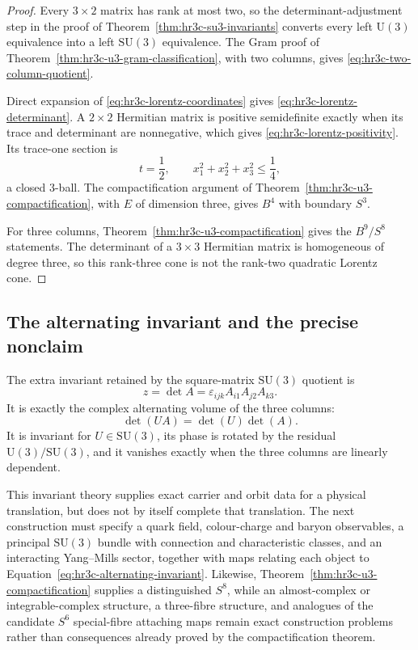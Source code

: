 \begin{proof}
Every \(3\times2\) matrix has rank at most two, so the determinant-adjustment
step in the proof of Theorem~\ref{thm:hr3c-su3-invariants} converts every
left \(\mathrm U(3)\) equivalence into a left \(\mathrm{SU}(3)\)
equivalence.  The Gram proof of
Theorem~\ref{thm:hr3c-u3-gram-classification}, with two columns, gives
\eqref{eq:hr3c-two-column-quotient}.

Direct expansion of \eqref{eq:hr3c-lorentz-coordinates} gives
\eqref{eq:hr3c-lorentz-determinant}.  A \(2\times2\) Hermitian matrix is
positive semidefinite exactly when its trace and determinant are
nonnegative, which gives \eqref{eq:hr3c-lorentz-positivity}.  Its trace-one
section is
\[
 t=\frac12,
 \qquad
 x_1^2+x_2^2+x_3^2\leq\frac14,
\]
a closed \(3\)-ball.  The compactification argument of
Theorem~\ref{thm:hr3c-u3-compactification}, with \(E\) of dimension three,
gives \(B^4\) with boundary \(S^3\).

For three columns, Theorem~\ref{thm:hr3c-u3-compactification} gives the
\(B^9/S^8\) statements.  The determinant of a \(3\times3\) Hermitian
matrix is homogeneous of degree three, so this rank-three cone is not the
rank-two quadratic Lorentz cone.
\end{proof}

\subsection{The alternating invariant and the precise nonclaim}
\label{subsec:hr3c-nonclaim}

The extra invariant retained by the square-matrix
\(\mathrm{SU}(3)\) quotient is
\begin{equation}
 z=\det A
 =\varepsilon_{ijk}A_{i1}A_{j2}A_{k3}.
 \label{eq:hr3c-alternating-invariant}
\end{equation}
It is exactly the complex alternating volume of the three columns:
\[
 \det(UA)=\det(U)\det(A).
\]
It is invariant for \(U\in\mathrm{SU}(3)\), its phase is rotated by the
residual \(\mathrm U(3)/\mathrm{SU}(3)\), and it vanishes exactly when the
three columns are linearly dependent.

This invariant theory supplies exact carrier and orbit data for a physical
translation, but does not by itself complete that translation.  The next
construction must specify a quark field, colour-charge and baryon
observables, a principal \(\mathrm{SU}(3)\) bundle with connection and
characteristic classes, and an interacting Yang--Mills sector, together with
maps relating each object to Equation~\eqref{eq:hr3c-alternating-invariant}.
Likewise, Theorem~\ref{thm:hr3c-u3-compactification} supplies a distinguished
\(S^8\), while an almost-complex or integrable-complex structure, a
three-fibre structure, and analogues of the candidate \(S^6\) special-fibre
attaching maps remain exact construction problems rather than consequences
already proved by the compactification theorem.

